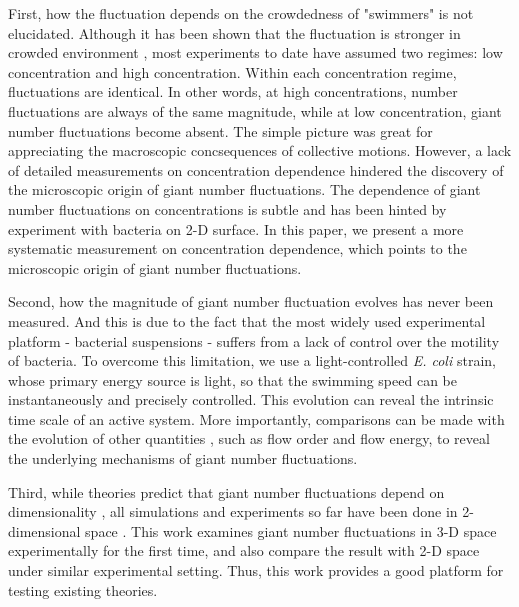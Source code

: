 \documentclass[twocolumn,aps,pre,amsmath,amssymb,floatfix,longbibliography]{revtex4-1}
\begin{document}
First, how the fluctuation depends on the crowdedness of "swimmers" is not elucidated. Although it has been shown that the fluctuation is stronger in crowded environment \cite{PhysRevE.95.020601, Zhang13626}, most experiments to date have assumed two regimes: low concentration and high concentration. Within each concentration regime, fluctuations are identical. In other words, at high concentrations, number fluctuations are always of the same magnitude, while at low concentration, giant number fluctuations become absent. The simple picture was great for appreciating the macroscopic concsequences of collective motions. However, a lack of detailed measurements on concentration dependence hindered the discovery of the microscopic origin of giant number fluctuations. The dependence of giant number fluctuations on concentrations is subtle and has been hinted by experiment with bacteria on 2-D surface\cite{Zhang13626}. In this paper, we present a more systematic measurement on concentration dependence, which points to the microscopic origin of giant number fluctuations.

Second, how the magnitude of giant number fluctuation evolves has never been measured. And this is due to the fact that the most widely used experimental platform - bacterial suspensions - suffers from a lack of control over the motility of bacteria. To overcome this limitation, we use a light-controlled \textit{E. coli} strain, whose primary energy source is light, so that the swimming speed can be instantaneously and precisely controlled. This evolution can reveal the intrinsic time scale of an active system. More importantly, comparisons can be made with the evolution of other quantities \cite{Peng2020}, such as flow order and flow energy, to reveal the underlying mechanisms of giant number fluctuations.

Third, while theories predict that giant number fluctuations depend on dimensionality \cite{PhysRevLett.75.4326, PhysRevE.58.4828, EPL2003, doi:10.1146/annurev-conmatphys-031119-050752}, all simulations and experiments so far have been done in 2-dimensional space \cite{PhysRevE.77.046113, PhysRevLett.123.218001, Schaller4488, PhysRevE.95.020601}. This work examines giant number fluctuations in 3-D space experimentally for the first time, and also compare the result with 2-D space under similar experimental setting. Thus, this work provides a good platform for testing existing theories.
\end{document}

